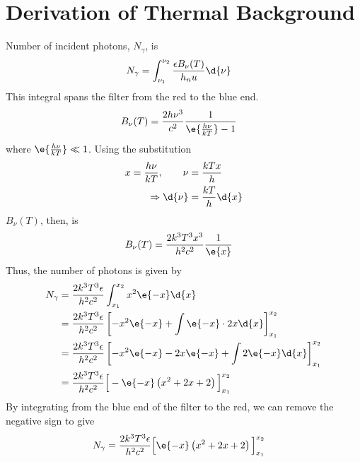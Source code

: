 
\section{Derivation of Thermal Background} %
\label{sec:derivation_of_thermal_background}
	Number of incident photons, $N_{\gamma}$, is
	\begin{align}
		N_{\gamma} &= \int_{\nu_1}^{\nu_2} \frac{\epsilon B_\nu(T)}{h_nu}\d{\nu}
	\end{align}
	This integral spans the filter from the red to the blue end.
	\begin{align}
		B_\nu(T) &= \frac{2h\nu^3}{c^2}\frac{1}{\e{\frac{h\nu}{kT}}-1}
	\end{align}
	where $\e{\frac{h\nu}{kT}} \ll 1$. Using the substitution
	\begin{align}
		x = \frac{h\nu}{kT}, \qquad \nu &= \frac{kTx}{h} \\
		\Rightarrow \d{\nu} &= \frac{kT}{h}\d{x}
	\end{align}
	$B_\nu(T)$, then, is
	\begin{align}
		B_\nu(T) &= \frac{2k^3 T^3 x^3}{h^2 c^2} \frac{1}{\e{x}}
	\end{align}
	Thus, the number of photons is given by
	\begin{align}
		N_\gamma &= \frac{2 k^3 T^3\epsilon}{h^2 c^2} \int_{x_1}^{x_2}x^2 \e{-x}\d{x} \\
			&= \frac{2 k^3 T^3\epsilon}{h^2 c^2} \left[ -x^2 \e{-x} + \int \e{-x}\cdot 2x\d{x} \right]_{x_1}^{x_2} \\
			&= \frac{2 k^3 T^3\epsilon}{h^2 c^2} \left[ -x^2 \e{-x} -2x\e{-x} + \int 2\e{-x}\d{x} \right]_{x_1}^{x_2} \\
			&= \frac{2 k^3 T^3\epsilon}{h^2 c^2} \Big[ -\e{-x}\left( x^2 + 2x + 2 \right) \Big]_{x_1}^{x_2}
	\end{align}
	By integrating from the blue end of the filter to the red, we can remove the negative sign to give
	\begin{align}
		N_\gamma &= \frac{2 k^3 T^3\epsilon}{h^2 c^2} \Big[\e{-x}\left( x^2 + 2x + 2 \right) \Big]_{x_1}^{x_2}
	\end{align}
